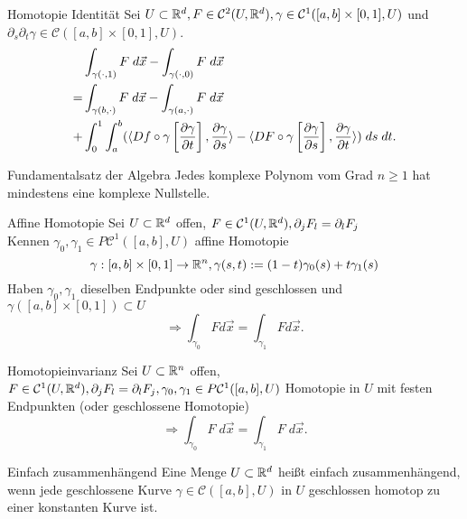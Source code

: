\documentclass[main.tex]{subfiles}
\begin{document}
\begin{karte}{Homotopie Identität}
    Sei \( U \subset \mathbb{R}^d, F \in \mathcal{C}^2(U, \mathbb{R}^d), 
    \gamma \in \mathcal{C}^1([a,b] \times [0,1], U) \) und 
    \( \partial_s \partial_t \gamma \in \mathcal{C}([a,b] \times [0,1], U) \).
    \begin{align*}
        &\int_{\gamma(\cdot, 1)} F \; d \vec{x}
        - \int_{\gamma(\cdot, 0)} F \; d\vec{x} \\
        = &\int_{\gamma(b, \cdot)} F \; d \vec{x} 
        - \int_{\gamma(a, \cdot)} F \; d\vec{x} \\
        + &\int_0^1 \int_a^b (\langle Df \circ \gamma
        \left[\frac{\partial\gamma}{\partial t}\right] ,  \frac{\partial\gamma}{\partial s}  \rangle 
        - \langle  DF \circ \gamma 
        \left[\frac{\partial\gamma}{\partial s}\right] ,  \frac{\partial\gamma}{\partial t}  \rangle ) 
        \; ds\; dt.
    \end{align*}
\end{karte}

\begin{karte}{Fundamentalsatz der Algebra}
    Jedes komplexe Polynom vom Grad \( n \geq 1 \) hat 
    mindestens eine komplexe Nullstelle.
\end{karte}

\begin{karte}{Affine Homotopie}
    Sei \(U \subset \mathbb{R}^d \) offen, \( F \in \mathcal{C}^1(U, \mathbb{R}^d), 
    \partial_j F_l = \partial_l F_j \)\\
    Kennen \( \gamma_0, \gamma_1 \in P\mathcal{C}^1([a,b], U) \) 
    affine Homotopie 
    \[ \gamma : [a,b] \times [0,1] \rightarrow \mathbb{R}^n, \gamma(s,t) 
    := (1-t)\gamma_0(s) + t \gamma_1(s) \]
    Haben \(\gamma_0,\gamma_1\) dieselben 
    Endpunkte oder sind geschlossen und 
    \(\gamma([a,b]\times[0,1]) \subset U \)
    \[ \Rightarrow \int_{\gamma_0} F d\vec{x} 
    = \int_{\gamma_1} F d\vec{x}. \]
\end{karte}

\begin{karte}{Homotopieinvarianz}
    Sei \( U \subset \mathbb{R}^n \) offen, 
    \( F \in \mathcal{C}^1(U, \mathbb{R}^d), 
    \partial_j F_l = \partial_l F_j, 
    \gamma_0, \gamma_1 \in P\mathcal{C}^1([a,b], U) \)
    Homotopie in \( U \) mit festen 
    Endpunkten (oder geschlossene Homotopie)
    \[ \Rightarrow \int_{\gamma_0} F \; d\vec{x} 
    = \int_{\gamma_1} F \; d\vec{x}. \]
\end{karte}

\begin{karte}{Einfach zusammenhängend}
    Eine Menge \(U \subset \mathbb{R}^d\) heißt einfach zusammenhängend, wenn jede
    geschlossene Kurve \(\gamma \in \mathcal{C}([a,b], U)\) in \(U\)
    geschlossen homotop zu einer konstanten Kurve ist.
\end{karte}
\end{document}

